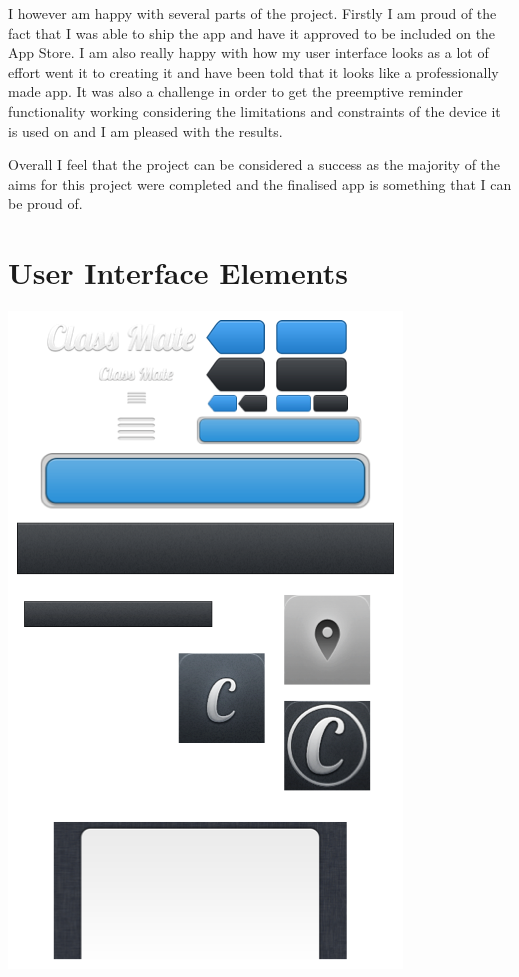 \documentclass[12pt]{report}
\begin{document}
I however am happy with several parts of the project. Firstly I am proud of the fact that I was able to ship the app and have it approved to be included on the App Store. I am also really happy with how my user interface looks as a lot of effort went it to creating it and have been told that it looks like a professionally made app. It was also a challenge in order to get the preemptive reminder functionality working considering the limitations and constraints of the device it is used on and I am pleased with the results.

Overall I feel that the project can be considered a success as the majority of the aims for this project were completed and the finalised app is something that I can be proud of.

\newpage
\printbibliography
\newpage

\appendix
\section{User Interface Elements}\label{appendix:appendix1}
\includegraphics{images/ui-elements}
\end{document}
